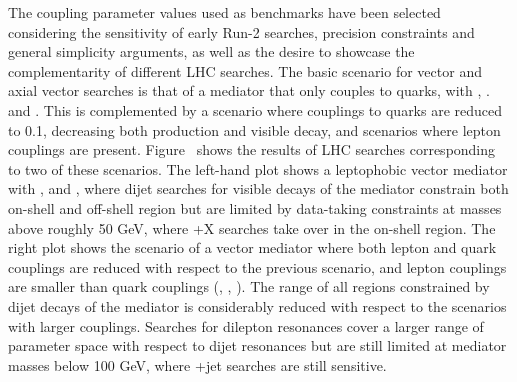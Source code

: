 The coupling parameter values used as benchmarks have been selected considering the sensitivity of early Run-2 searches, precision constraints and general simplicity arguments, as well as the desire to showcase the complementarity of different LHC searches. The basic scenario for vector and axial vector searches is that of a mediator that only couples to quarks, with , . and . This is complemented by a scenario where couplings to quarks are reduced to 0.1, decreasing both production and visible decay, and scenarios where lepton couplings are present. Figure~\label{fig:sensitivityComparison} shows the results of LHC searches corresponding to two of these scenarios. The left-hand plot shows a leptophobic vector mediator with ,  and , where dijet searches for visible decays of the mediator constrain both on-shell and off-shell region but are limited by data-taking constraints at masses above roughly 50 GeV, where \MET+X searches take over in the on-shell region. 
The right plot shows the scenario of a vector mediator where both lepton and quark couplings are reduced with respect to the previous scenario, and lepton couplings are smaller than quark couplings (, , ). 
The range of all regions constrained by dijet decays of the mediator is considerably reduced with respect to the scenarios with larger couplings. Searches for dilepton resonances cover a larger range of parameter space with respect to dijet resonances but are still limited at mediator masses below 100 GeV, where \MET+jet searches are still sensitive. 


